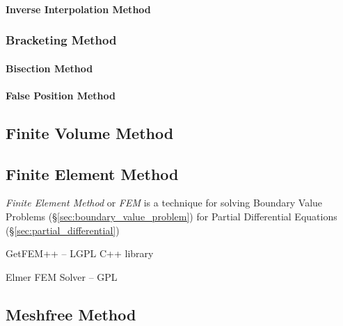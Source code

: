\paragraph{Inverse Interpolation Method}\label{sec:inverse_interpolation}\hfill



\subsubsection{Bracketing Method}\label{sec:bracketing_method}

\paragraph{Bisection Method}\label{sec:bisection_method}\hfill

\paragraph{False Position Method}\label{sec:false_position}\hfill



\subsection{Finite Volume Method}\label{sec:finite_volume_method}

\subsection{Finite Element Method}\label{sec:finite_element_method}

\emph{Finite Element Method} or \emph{FEM} is a technique for solving Boundary
Value Problems (\S\ref{sec:boundary_value_problem}) for Partial Differential
Equations (\S\ref{sec:partial_differential})

GetFEM++ -- LGPL C++ library

Elmer FEM Solver -- GPL



\subsection{Meshfree Method}\label{sec:meshfree_method}

